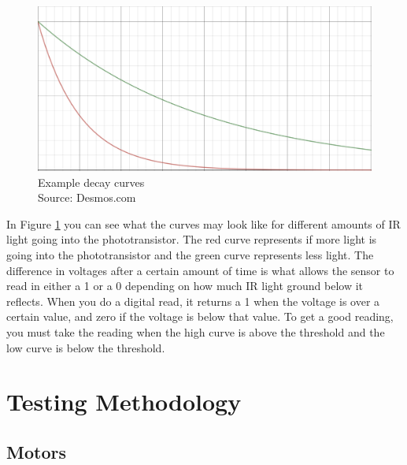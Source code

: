 \documentclass[12pt]{article}
\begin{document}
\begin{figure}[h]
  \begin{center}
  \includegraphics[width=0.5\linewidth]{curves.png}
  \caption{Example decay curves \\ Source: Desmos.com}
  \label{fig:curves}
  \end{center}
\end{figure}
In Figure \ref{fig:curves} you can see what the curves may look like for different amounts of IR light going into the phototransistor. The red curve represents if more light is going into the phototransistor and the green curve represents less light. The difference in voltages after a certain amount of time is what allows the sensor to read in either a 1 or a 0 depending on how much IR light ground below it reflects. When you do a digital read, it returns a 1 when the voltage is over a certain value, and zero if the voltage is below that value. To get a good reading, you must take the reading when the high curve is above the threshold and the low curve is below the threshold.

\section{Testing Methodology}
\subsection{Motors}
\end{document}
